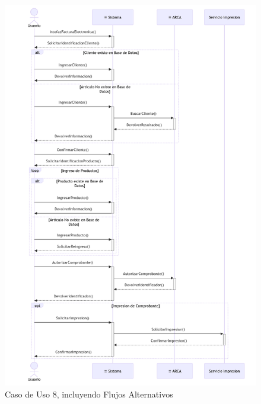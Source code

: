 \begin{figure}[H]
	\centering
	\vspace{15pt}
	\caption{Caso de Uso 8, incluyendo Flujos Alternativos}
	\vspace{15pt}
	\includegraphics[width=.95\textwidth]{img/04-diagrama-caso-8.png}
	\vspace{15pt}
\end{figure}